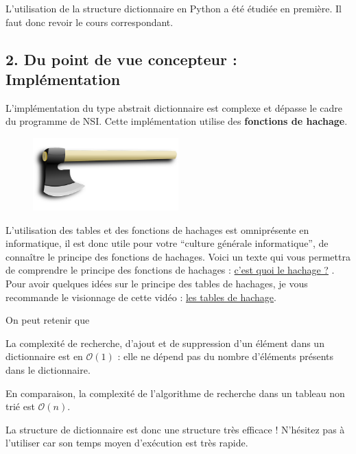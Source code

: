 \documentclass[
  a4paper,
  DIV=11,
  numbers=noendperiod]{scrartcl}
\begin{document}
L'utilisation de la structure dictionnaire en Python a été étudiée en
première. Il faut donc revoir le cours correspondant.

\hypertarget{du-point-de-vue-concepteur-impluxe9mentation}{%
\subsection{2. Du point de vue concepteur :
Implémentation}\label{du-point-de-vue-concepteur-impluxe9mentation}}

L'implémentation du type abstrait dictionnaire est complexe et dépasse
le cadre du programme de NSI. Cette implémentation utilise des
\textbf{fonctions de hachage}.

\begin{figure}

{\centering \includegraphics[width=0.5\textwidth,height=\textheight]{hache.png}

}

\end{figure}

L'utilisation des tables et des fonctions de hachages est omniprésente
en informatique, il est donc utile pour votre ``culture générale
informatique'', de connaître le principe des fonctions de hachages.
Voici un texte qui vous permettra de comprendre le principe des
fonctions de hachages :
\href{https://culture-informatique.net/cest-quoi-hachage/}{c'est quoi le
hachage ?} . Pour avoir quelques idées sur le principe des tables de
hachages, je vous recommande le visionnage de cette vidéo :
\href{https://www.youtube.com/watch?v=CkLctGYWFPA}{les tables de
hachage}.

On peut retenir que

\begin{tcolorbox}[enhanced jigsaw, colback=white, colbacktitle=quarto-callout-important-color!10!white, bottomtitle=1mm, coltitle=black, opacitybacktitle=0.6, opacityback=0, leftrule=.75mm, breakable, toprule=.15mm, arc=.35mm, titlerule=0mm, toptitle=1mm, title=\textcolor{quarto-callout-important-color}{\faExclamation}\hspace{0.5em}{À retenir}, rightrule=.15mm, left=2mm, bottomrule=.15mm]

La complexité de recherche, d'ajout et de suppression d'un élément dans
un dictionnaire est en \(\mathcal{O}(1)\) : elle ne dépend pas du nombre
d'éléments présents dans le dictionnaire.

En comparaison, la complexité de l'algorithme de recherche dans un
tableau non trié est \(\mathcal{O}(n)\).

La structure de dictionnaire est donc une structure très efficace !
N'hésitez pas à l'utiliser car son temps moyen d'exécution est très
rapide.

\end{tcolorbox}
\end{document}
